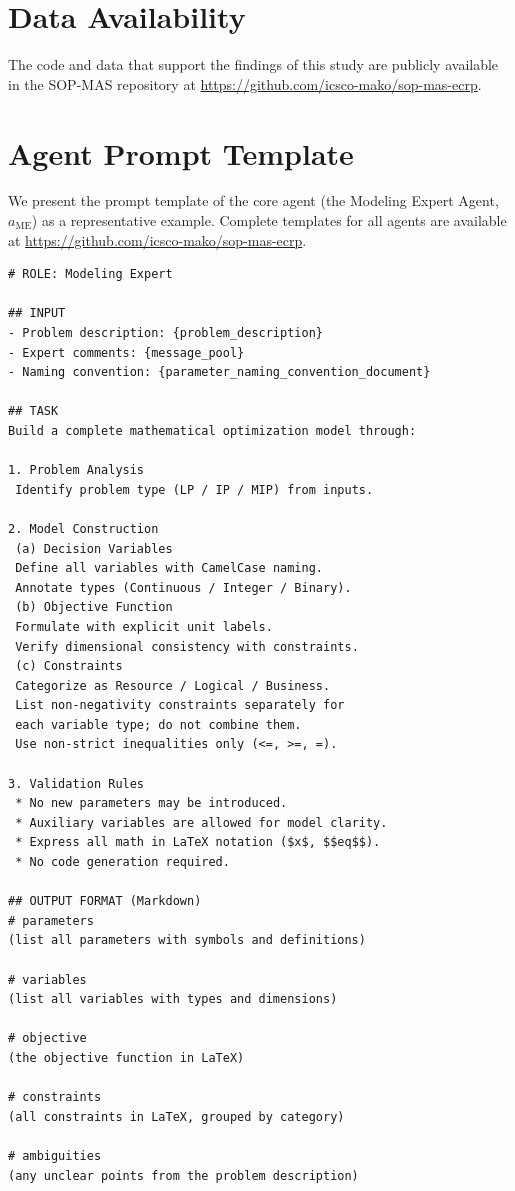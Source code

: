 \documentclass[preprint,12pt]{elsarticle}
\begin{document}
\section*{Data Availability}
The code and data that support the findings of this study are publicly available in the SOP-MAS repository at \url{https://github.com/icsco-mako/sop-mas-ecrp}.



\clearpage
\appendix
\section{Agent Prompt Template}\label{app1}
We present the prompt template of the core agent (the Modeling Expert Agent, $a_{\text{ME}}$) as a representative example. Complete templates for all agents are available at \url{https://github.com/icsco-mako/sop-mas-ecrp}.

\begin{nolinenumbers}
\begin{promptbox}
\begin{lstlisting}[style=prompttemplate]
# ROLE: Modeling Expert

## INPUT
- Problem description: {problem_description}
- Expert comments: {message_pool}
- Naming convention: {parameter_naming_convention_document}

## TASK
Build a complete mathematical optimization model through:

1. Problem Analysis
 Identify problem type (LP / IP / MIP) from inputs.

2. Model Construction
 (a) Decision Variables
 Define all variables with CamelCase naming.
 Annotate types (Continuous / Integer / Binary).
 (b) Objective Function
 Formulate with explicit unit labels.
 Verify dimensional consistency with constraints.
 (c) Constraints
 Categorize as Resource / Logical / Business.
 List non-negativity constraints separately for
 each variable type; do not combine them.
 Use non-strict inequalities only (<=, >=, =).

3. Validation Rules
 * No new parameters may be introduced.
 * Auxiliary variables are allowed for model clarity.
 * Express all math in LaTeX notation ($x$, $$eq$$).
 * No code generation required.

## OUTPUT FORMAT (Markdown)
# parameters
(list all parameters with symbols and definitions)

# variables
(list all variables with types and dimensions)

# objective
(the objective function in LaTeX)

# constraints
(all constraints in LaTeX, grouped by category)

# ambiguities
(any unclear points from the problem description)
\end{lstlisting}
\end{promptbox}
\label{lst:me-agent-prompt}
\end{nolinenumbers}
\end{document}
